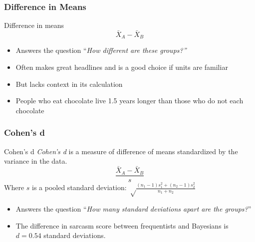 \documentclass[12pt, block=fill]{beamer}
\begin{document}
\begin{frame}
  \frametitle{Difference in Means}

  \begin{block}{Difference in means}
    \[
      \bar{X}_{A} - \bar{X}_{B}
    \]
  \end{block}
    \begin{itemize}
    \item Answers the question ``\textit{How different are these
        groups?''}
    \item Often makes great headlines
      and is a good choice if units are familiar
    \item But lacks context in its calculation
  \item People who eat chocolate live 1.5 years longer than those who
    do not each chocolate
  \end{itemize}
\end{frame}


  \begin{frame}
    \frametitle{Cohen's d}

    \begin{block}{Cohen's d}
      \small
    \textit{Cohen's d} is a measure of difference of means
    standardized by the variance in the data.
    \[
      \frac{ \bar{X}_{A} - \bar{X}_{B} }{s}
    \]
    Where $s$ is a pooled standard deviation:
    $\sqrt \frac{(n_1-1)s_1^2 + (n_2-1)s_2^2}{n_1+n_2}$
  \end{block}

  \begin{itemize}
  \item Answers the question ``\textit{How many standard
      deviations apart are the groups?}''
  \item The difference in sarcasm score between frequentists and
    Bayesians is $d = 0.54$ standard deviations.
  \end{itemize}
\end{frame}
\end{document}
